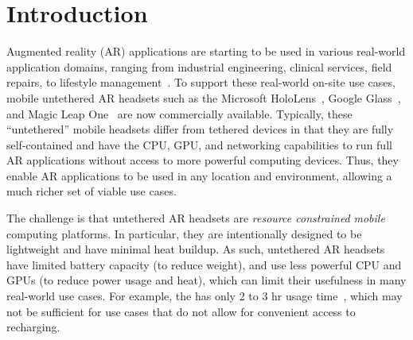 \vspace{-2ex}
\section{Introduction}
\label{sec:intro}


Augmented reality (AR) applications are starting to be used in various  
real-world application domains, ranging from industrial engineering, 
clinical services, field repairs, to lifestyle 
management~\cite{Wang2016,pokemongo,ikeaplace,augmedix,evalARVRTraining}.
%
To support these real-world on-site use cases, mobile untethered AR headsets 
such as the Microsoft HoloLens~\cite{hololens}, 
Google Glass~\cite{googleglass}, and Magic Leap One~\cite{magicleapone} 
are now commercially available. 
%
Typically, these ``untethered'' mobile headsets differ from tethered devices 
in that they are fully self-contained and have the CPU, GPU, and 
networking capabilities to run full AR applications without access to 
more powerful computing devices. %
%
Thus, they enable AR applications to be used in any location and environment,
allowing a much richer set of viable use cases.





The challenge is that untethered AR headsets are \emph{resource constrained} 
\textit{mobile} computing platforms.
%
In particular, they are intentionally designed to be lightweight and have 
minimal heat buildup. %
%
As such, untethered AR headsets have limited battery capacity 
(to reduce weight), and use less powerful CPU and GPUs 
(to reduce power usage and heat), 
%
which can limit their usefulness %
in many real-world use cases. 
%
For example, the {\mlo} has only 2 to 3 hr usage time~\cite{magicleapone}, which may not be
sufficient for use cases that do not allow for convenient access to recharging.


%
%
%
%


